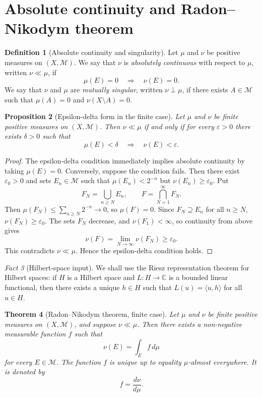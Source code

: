 \documentclass[11pt,openany]{book}
\numberwithin{equation}{chapter}
\theoremstyle{definition}
\newtheorem{definition}{Definition}[chapter]
\theoremstyle{plain}
\newtheorem{theorem}[definition]{Theorem}
\newtheorem{proposition}[definition]{Proposition}
\theoremstyle{remark}
\newtheorem{fact}[definition]{Fact}
\newcommand{\C}{\mathbb{C}}
\newcommand{\M}{\mathcal{M}}
\newcommand{\eps}{\varepsilon}
\newcommand{\1}{\mathbf{1}}
\newcommand{\dd}{\,d}
\begin{document}
\section{Absolute continuity and Radon--Nikodym theorem}

\begin{definition}[Absolute continuity and singularity]
Let \(\mu\) and \(\nu\) be positive measures on \((X,\M)\). We say that \(\nu\) is \emph{absolutely continuous} with respect to \(\mu\), written \(\nu\ll\mu\), if
\[
  \mu(E)=0\quad\Longrightarrow\quad \nu(E)=0.
\]
We say that \(\nu\) and \(\mu\) are \emph{mutually singular}, written \(\nu\perp\mu\), if there exists \(A\in\M\) such that \(\mu(A)=0\) and \(\nu(X\setminus A)=0\).
\end{definition}

\begin{proposition}[Epsilon-delta form in the finite case]
Let \(\mu\) and \(\nu\) be finite positive measures on \((X,\M)\). Then \(\nu\ll\mu\) if and only if for every \(\eps>0\) there exists \(\delta>0\) such that
\[
  \mu(E)<\delta\quad\Longrightarrow\quad \nu(E)<\eps.
\]
\end{proposition}

\begin{proof}
The epsilon-delta condition immediately implies absolute continuity by taking \(\mu(E)=0\). Conversely, suppose the condition fails. Then there exist \(\eps_0>0\) and sets \(E_n\in\M\) such that \(\mu(E_n)<2^{-n}\) but \(\nu(E_n)\geq\eps_0\). Put
\[
  F_N=\bigcup_{n\geq N}E_n,
  \qquad
  F=\bigcap_{N=1}^{\infty}F_N.
\]
Then \(\mu(F_N)\leq\sum_{n\geq N}2^{-n}\to0\), so \(\mu(F)=0\). Since \(F_N\supseteq E_n\) for all \(n\geq N\), \(\nu(F_N)\geq\eps_0\). The sets \(F_N\) decrease, and \(\nu(F_1)<\infty\), so continuity from above gives
\[
  \nu(F)=\lim_{N\to\infty}\nu(F_N)\geq\eps_0.
\]
This contradicts \(\nu\ll\mu\). Hence the epsilon-delta condition holds.
\end{proof}

\begin{fact}[Hilbert-space input]
We shall use the Riesz representation theorem for Hilbert spaces: if \(H\) is a Hilbert space and \(L:H\to\C\) is a bounded linear functional, then there exists a unique \(h\in H\) such that \(L(u)=\langle u,h\rangle\) for all \(u\in H\).
\end{fact}

\begin{theorem}[Radon--Nikodym theorem, finite case]
Let \(\mu\) and \(\nu\) be finite positive measures on \((X,\M)\), and suppose \(\nu\ll\mu\). Then there exists a non-negative measurable function \(f\) such that
\[
  \nu(E)=\int_E f\dd\mu
\]
for every \(E\in\M\). The function \(f\) is unique up to equality \(\mu\)-almost everywhere. It is denoted by
\[
  f=\frac{d\nu}{d\mu}.
\]
\end{theorem}
\end{document}
